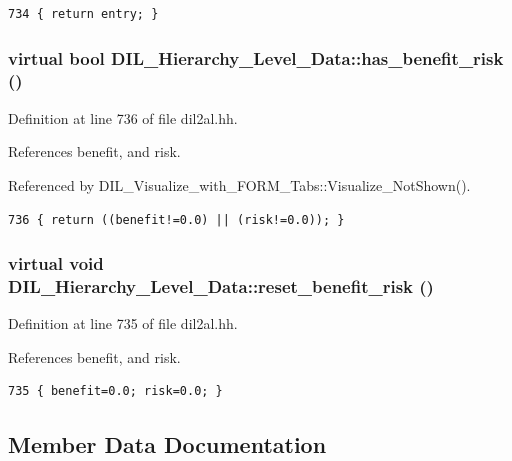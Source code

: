 \footnotesize\begin{verbatim}734 { return entry; }
\end{verbatim}\normalsize 
{}
\subsubsection{\setlength{\rightskip}{0pt plus 5cm}virtual bool DIL\_\-Hierarchy\_\-Level\_\-Data::has\_\-benefit\_\-risk ()\hspace{0.3cm}{\tt  [inline, virtual]}}\label{classDIL__Hierarchy__Level__Data_a3}




Definition at line 736 of file dil2al.hh.

References benefit, and risk.

Referenced by DIL\_\-Visualize\_\-with\_\-FORM\_\-Tabs::Visualize\_\-Not\-Shown().



\footnotesize\begin{verbatim}736 { return ((benefit!=0.0) || (risk!=0.0)); }
\end{verbatim}\normalsize 
{}
\subsubsection{\setlength{\rightskip}{0pt plus 5cm}virtual void DIL\_\-Hierarchy\_\-Level\_\-Data::reset\_\-benefit\_\-risk ()\hspace{0.3cm}{\tt  [inline, virtual]}}\label{classDIL__Hierarchy__Level__Data_a2}




Definition at line 735 of file dil2al.hh.

References benefit, and risk.



\footnotesize\begin{verbatim}735 { benefit=0.0; risk=0.0; }
\end{verbatim}\normalsize 


\subsection{Member Data Documentation}
